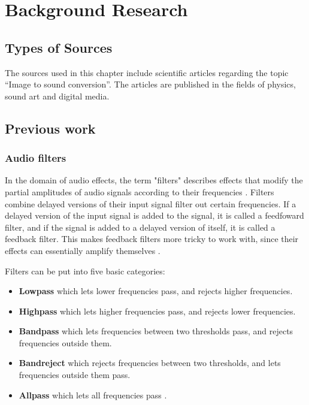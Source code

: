 \chapter{Background Research}\label{ch:bgresearch}

\section{Types of Sources}\label{sec:typesofsources} 
The sources used in this chapter include scientific articles regarding the topic “Image to sound conversion”. The articles are published in the fields of physics, sound art and digital media.

\section{Previous work}\label{sec:previouswork}

\subsection{Audio filters}

In the domain of audio effects, the term "filters" describes effects that modify the partial amplitudes of audio signals according to their frequencies \cite{zolzer2011dafx}. Filters combine delayed versions of their input signal filter out certain frequencies. If a delayed version of the input signal is added to the signal, it is called a feedfoward filter, and if the signal is added to a delayed version of itself, it is called a feedback filter. This makes feedback filters more tricky to work with, since their effects can essentially amplify themselves \cite{steiglitz1997digital}.

Filters can be put into five basic categories:
\begin{itemize}
\item \textbf{Lowpass} which lets lower frequencies pass, and rejects higher frequencies.
\item \textbf{Highpass} which lets higher frequencies pass, and rejects lower frequencies.
\item \textbf{Bandpass} which lets frequencies between two thresholds pass, and rejects frequencies outside them.
\item \textbf{Bandreject} which rejects frequencies between two thresholds, and lets frequencies outside them pass.
\item \textbf{Allpass} which lets all frequencies pass \cite{zolzer2011dafx}.
\end{itemize}


